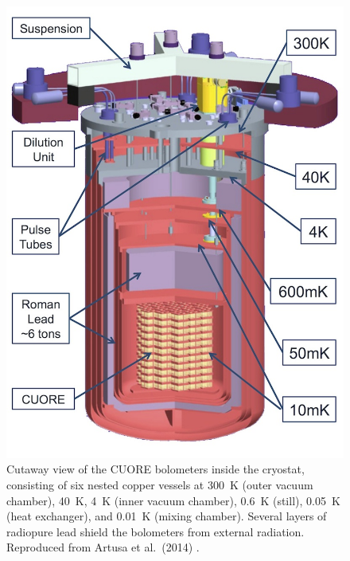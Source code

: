 \documentclass{PoS}
\begin{document}
\begin{figure}
\centering
\includegraphics[scale=.225]{img/CUORE.jpg}
\caption{Cutaway view of the CUORE bolometers inside the cryostat, consisting of six nested copper vessels at 300~K (outer vacuum chamber), 40~K, 4~K (inner vacuum chamber), 0.6~K (still), 0.05~K (heat exchanger), and 0.01~K (mixing chamber). Several layers of radiopure lead shield the bolometers from external radiation. Reproduced from Artusa et al.\ (2014) \cite{Artusa:2014lgv}.} \label{fig:Cuore}
\end{figure}
\end{document}
